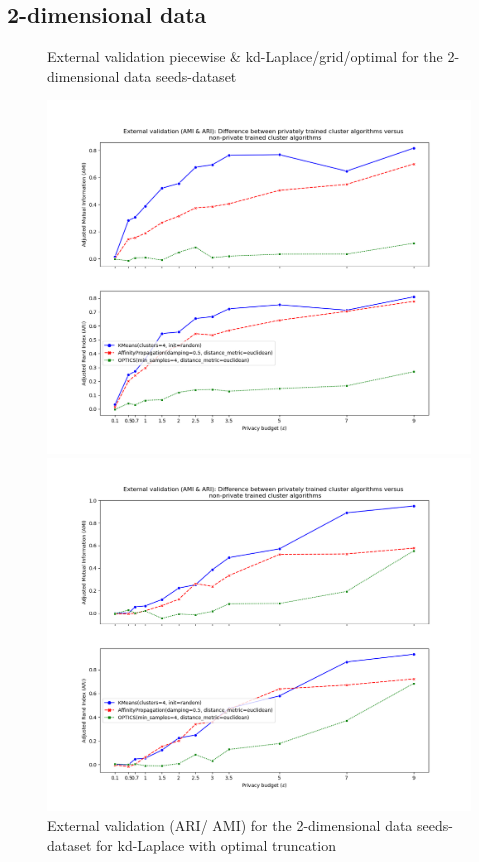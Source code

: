 \subsection{2-dimensional data}
\begin{figure}[H]
    \caption{External validation piecewise \& kd-Laplace/grid/optimal for the 2-dimensional data seeds-dataset}
    \centering
    \begin{minipage}[c]{0.49\textwidth}
        \includegraphics[width=1\textwidth]{Results/2d-laplace-optimal-truncated/seeds-dataset/ami-and-ari.png}
        \caption{External validation (ARI/ AMI) for the 2-dimensional data seeds-dataset for kd-Laplace with optimal truncation}
        \label{fig:external-validation-seeds-dataset_comparison_2d-laplace}
    \end{minipage}
    \begin{minipage}[c]{0.49\textwidth}
        \includegraphics[width=1\textwidth]{Results/2d-piecewise/seeds-dataset/ami-and-ari.png}

\end{minipage}
\end{figure}
